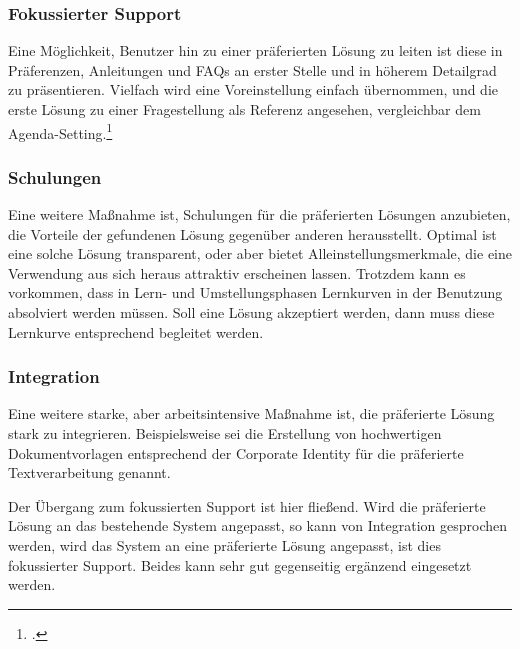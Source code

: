 \subsubsection{Fokussierter Support}
Eine Möglichkeit, Benutzer hin zu einer präferierten Lösung zu leiten ist diese in Präferenzen, Anleitungen und FAQs an erster Stelle und in höherem Detailgrad zu präsentieren. Vielfach wird eine Voreinstellung einfach übernommen, und die erste Lösung zu einer Fragestellung als Referenz angesehen, vergleichbar dem Agenda-Setting.\footcite[Vgl.][]{bonfadelli_medienwirkungsforschung_2015}

\subsubsection{Schulungen}
Eine weitere Maßnahme ist, Schulungen für die präferierten Lösungen anzubieten, die Vorteile der gefundenen Lösung gegenüber anderen herausstellt. Optimal ist eine solche Lösung transparent, oder aber bietet Alleinstellungsmerkmale, die eine Verwendung aus sich heraus attraktiv erscheinen lassen. Trotzdem kann es vorkommen, dass in Lern- und Umstellungsphasen Lernkurven in der Benutzung absolviert werden müssen. Soll eine Lösung akzeptiert werden, dann muss diese Lernkurve entsprechend begleitet werden.

\subsubsection{Integration}
Eine weitere starke, aber arbeitsintensive Maßnahme ist, die präferierte Lösung stark zu integrieren. Beispielsweise sei die Erstellung von hochwertigen Dokumentvorlagen entsprechend der Corporate Identity für die präferierte Textverarbeitung genannt.

Der Übergang zum fokussierten Support ist hier fließend. Wird die präferierte Lösung an das bestehende System angepasst, so kann von Integration gesprochen werden, wird das System an eine präferierte Lösung angepasst, ist dies fokussierter Support. Beides kann sehr gut gegenseitig ergänzend eingesetzt werden.